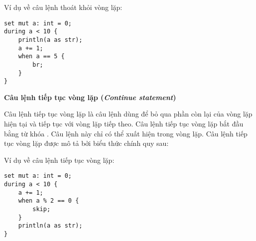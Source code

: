 \regexbreakstmt

\noindent Ví dụ về câu lệnh thoát khỏi vòng lặp:
\begin{lstlisting}[]
set mut a: int = 0;
during a < 10 {
    println(a as str);
    a += 1;
    when a == 5 {
        br;
    }
}
\end{lstlisting}

\noindent\textbf{Câu lệnh tiếp tục vòng lặp (\textit{Continue statement})}

    Câu lệnh tiếp tục vòng lặp là câu lệnh dùng để bỏ qua phần còn lại của vòng lặp hiện tại và tiếp tục với vòng lặp tiếp theo. Câu lệnh tiếp tục vòng lặp bắt đầu bằng từ khóa . Câu lệnh này chỉ có thể xuất hiện trong vòng lặp. Câu lệnh tiếp tục vòng lặp được mô tả bởi biểu thức chính quy sau:

\regexcontinuestmt

\noindent Ví dụ về câu lệnh tiếp tục vòng lặp:
\begin{lstlisting}[]
set mut a: int = 0;
during a < 10 {
    a += 1;
    when a % 2 == 0 {
        skip;
    }
    println(a as str);
}
\end{lstlisting}
